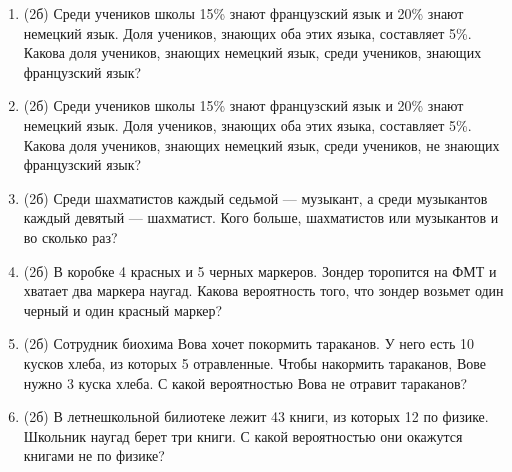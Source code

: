 \documentclass[a4paper, 12pt]{article}
\begin{document}
\begin{enumerate}
  \item (2б) Среди учеников школы 15\% знают французский язык и 20\% знают немецкий язык. Доля учеников, знающих оба этих языка, составляет 5\%. Какова доля учеников, знающих немецкий язык, среди учеников, знающих французский язык?
  \item (2б) Среди учеников школы 15\% знают французский язык и 20\% знают немецкий язык. Доля учеников, знающих оба этих языка, составляет 5\%. Какова доля учеников, знающих немецкий язык, среди учеников, не знающих французский язык?
  \item (2б) Среди шахматистов каждый седьмой — музыкант, а среди музыкантов каждый девятый — шахматист. Кого больше, шахматистов или музыкантов и во сколько раз?
  \item (2б) В коробке 4 красных и 5 черных маркеров.
  Зондер торопится на ФМТ и хватает два маркера наугад.
  Какова вероятность того, что зондер возьмет один черный и один красный маркер?
  \item (2б) Сотрудник биохима Вова хочет покормить тараканов.
  У него есть 10 кусков хлеба, из которых 5 отравленные. Чтобы накормить тараканов,
  Вове нужно 3 куска хлеба. С какой вероятностью Вова не отравит тараканов?
  \item (2б) В летнешкольной билиотеке лежит 43 книги, из которых 12 по физике.
  Школьник наугад берет три книги. С какой вероятностью они окажутся книгами не по физике?
\end{enumerate}
\end{document}
